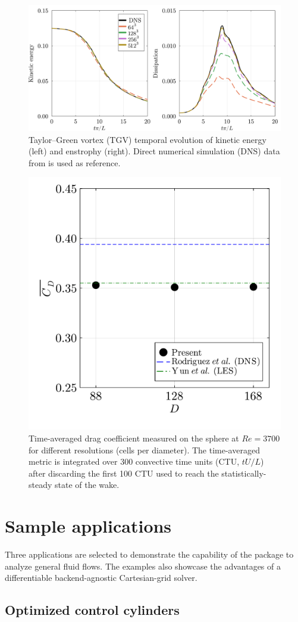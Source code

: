 \documentclass[10pt,a4paper]{article}
\begin{document}
\begin{figure}[!t]
    \centering
    \includegraphics[width=0.7\linewidth]{img/tgv_validation.pdf}
	\caption{Taylor--Green vortex (TGV) temporal evolution of kinetic energy (left) and enstrophy (right). Direct numerical simulation (DNS) data from \cite{Dairay2017} is used as reference.}
	\label{fig:tgv_val}
\end{figure}

\begin{figure}[!t]
  \centering
  \includegraphics[width=0.4\linewidth]{img/sphere_validation.pdf}
  \vspace*{-0.5cm}
  \caption{Time-averaged drag coefficient measured on the sphere at $Re=3700$ for different resolutions (cells per diameter). The time-averaged metric is integrated over 300 convective time units (CTU, $tU/L$) after discarding the first 100 CTU used to reach the statistically-steady state of the wake.}
  \label{fig:sphere_val}
\end{figure}

\section{Sample applications}\label{sec:applications}
Three applications are selected to demonstrate the capability of the package to analyze general fluid flows. The examples also showcase the advantages of a differentiable backend-agnostic Cartesian-grid solver.

\subsection{Optimized control cylinders}
\end{document}
